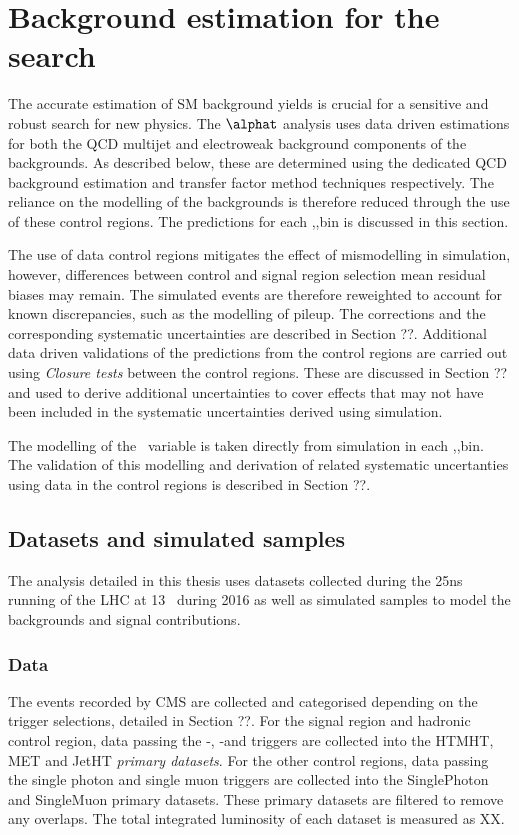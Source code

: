 \chapter{Background estimation for the \alphat search}

The accurate estimation of SM background yields is crucial for a sensitive and robust
search for new physics. The $\alphat$ analysis uses data driven estimations for both the
QCD multijet and electroweak background components of the backgrounds. As described below, 
these are determined using the dedicated QCD background estimation and transfer factor 
method techniques respectively. The reliance on the modelling of the backgrounds 
is therefore reduced through the use of these control regions. The predictions for
each \nj,\nb,\scalht bin is discussed in this section. 

The use of data control regions mitigates the effect of mismodelling in simulation, however,
differences between control and signal region selection mean residual biases may remain.
The simulated events are therefore reweighted to account for known discrepancies, 
such as the modelling of pileup. The corrections and the corresponding systematic uncertainties
are described in Section ??. Additional data driven validations of the predictions from the
control regions are carried out using \emph{Closure tests} between the control regions. 
These are discussed in Section ?? and used to derive additional uncertainties to cover effects 
that may not have been included in the systematic uncertainties derived using simulation.

The modelling of the \mht~variable is taken directly from simulation in each \nj,\nb,\scalht bin.
The validation of this modelling and derivation of related systematic uncertanties using
data in the control regions is described in Section ??.

\section{Datasets and simulated samples}
The analysis detailed in this thesis uses datasets collected during the 25ns running of the 
LHC at 13 \TeV~during 2016 as well as simulated samples to model the backgrounds and
signal contributions.
\subsection{Data}
The events recorded by CMS are collected and categorised depending on the trigger selections, 
detailed in Section ??. For the signal region and hadronic control region, data passing the \alphat-\scalht,
\mht-\met and \scalht triggers are collected into the HTMHT, MET and JetHT \emph{primary datasets}.
For the other control regions, data passing the single photon and single muon triggers are collected 
into the SinglePhoton and SingleMuon primary datasets. These primary datasets are filtered to remove
any overlaps. The total integrated luminosity of each dataset is measured as XX\ifb.
